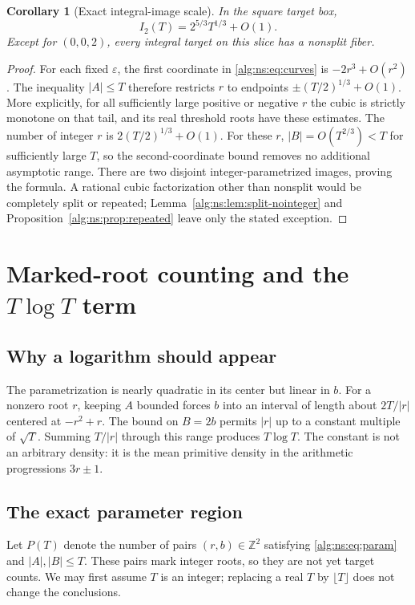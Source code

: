 \documentclass[11pt]{article}
\numberwithin{equation}{section}
\theoremstyle{plain}
\theoremstyle{plain}
\theoremstyle{plain}
\newtheorem{corollary}[corollary]{Corollary}
\theoremstyle{definition}
\theoremstyle{definition}
\theoremstyle{definition}
\theoremstyle{remark}
\newcommand{\Z}{\mathbb Z}\newcommand{\Q}{\mathbb Q}
\begin{document}
\begin{corollary}[Exact integral-image scale]\label{alg:ns:cor:integral-count}
In the square target box,
\[
I_2(T)=2^{5/3}T^{1/3}+O(1).
\]
Except for $(0,0,2)$, every integral target on this slice has a nonsplit
fiber.
\end{corollary}
\begin{proof}
For each fixed $\varepsilon$, the first coordinate in
\eqref{alg:ns:eq:curves} is $-2r^3+O(r^2)$. The inequality $|A|\le T$ therefore
restricts $r$ to endpoints
$\pm(T/2)^{1/3}+O(1)$. More explicitly, for all sufficiently large
positive or negative $r$ the cubic is strictly monotone on that tail,
and its real threshold roots have these estimates. The number of
integer $r$ is $2(T/2)^{1/3}+O(1)$.
For these $r$, $|B|=O(T^{2/3})<T$ for sufficiently large $T$, so the
second-coordinate bound removes no additional asymptotic range.
There are two disjoint integer-parametrized images, proving the formula. A rational cubic
factorization other than nonsplit would be completely split or repeated;
Lemma~\ref{alg:ns:lem:split-nointeger} and Proposition~\ref{alg:ns:prop:repeated}
leave only the stated exception.
\end{proof}

\section{Marked-root counting and the \texorpdfstring{$T\log T$}{T log T} term}\label{alg:ns:sec:count}

\subsection{Why a logarithm should appear}
The parametrization is nearly quadratic in its center but linear in
$b$. For a nonzero root $r$, keeping $A$ bounded forces $b$ into an
interval of length about $2T/|r|$ centered at $-r^2+r$. The bound on
$B=2b$ permits $|r|$ up to a constant multiple of $\sqrt T$.
Summing $T/|r|$ through this range produces $T\log T$. The constant is
not an arbitrary density: it is the mean primitive density in the
arithmetic progressions $3r\pm1$.

\subsection{The exact parameter region}
Let $P(T)$ denote the number of pairs $(r,b)\in\Z^2$ satisfying
\eqref{alg:ns:eq:param} and $|A|,|B|\le T$. These pairs mark integer roots,
so they are not yet target counts. We may first assume $T$ is an integer;
replacing a real $T$ by $\lfloor T\rfloor$ does not change the conclusions.
\end{document}
